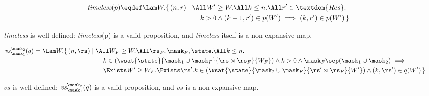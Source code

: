 
\begin{align*}
	\textit{timeless}(p) \eqdef 
	\begin{aligned}[t]
		\Lam W.
		\{\, (n, r) &\mid \All W' \geq W. \All k \leq n. \All r' \in \textdom{Res}. \\
		&\qquad
		k > 0 \land (k - 1, r') \in p(W') \implies (k, r') \in p(W') \,\}
	\end{aligned}
\end{align*}

\begin{lem}
	\textit{timeless} is well-defined: \textit{timeless}(p) is a valid proposition, and \textit{timeless} itself is a non-expansive map.
\end{lem}


\begin{align*}
	\mathit{vs}_{\mask_1}^{\mask_2}(q) &= \Lam W.
	\begin{aligned}[t]
		\{\, (n, \rs) &\mid \All W_F \geq W. \All \rs_F, \mask_F, \state. \All k \leq n.\\
		&\qquad 
		k \in (\wsat{\state}{\mask_1 \cup \mask_F}{\rs \rtimes \rs_F}{W_F}) \land k > 0 \land \mask_F \sep (\mask_1 \cup \mask_2) \implies{} \\
		&\qquad
		\Exists W' \geq W_F. \Exists \rs'. k \in (\wsat{\state}{\mask_2 \cup \mask_F}{\rs' \rtimes \rs_F}{W'}) \land (k, \rs') \in q(W')
		\,\}
	\end{aligned}
\end{align*}
\begin{lem}
	$\mathit{vs}$ is well-defined: $\mathit{vs}_{\mask_1}^{\mask_2}(q)$ is a valid proposition, and $\mathit{vs}$ is a non-expansive map.
\end{lem}



